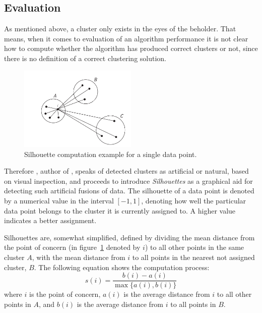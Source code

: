 \subsection{Evaluation}
As mentioned above, a cluster only exists in the eyes of the 
beholder. That means, when it comes to evaluation of an algorithm 
performance it is not clear how to compute whether the algorithm has produced
correct clusters or not, since there is no definition of a correct clustering solution. 
\begin{figure}[h!]
    \centering
    \includegraphics[width=0.5\textwidth]{images/silhouette_computation_clusters.pdf}
    \caption{Silhouette computation example for a single data point.
    \label{fig:silhouette-computation-clusters} }
\end{figure}

Therefore \citeauthor{silhouettes}, author of , speaks of detected clusters
as artificial or natural, based on visual inspection, and proceeds 
to introduce \emph{Silhouettes} as a graphical aid for detecting 
such artificial fusions of data. The silhouette of a data point is 
denoted by a numerical value in the interval $[-1, 1]$, denoting how well
the particular data point belongs to the cluster it is currently
assigned to. A higher value indicates a better assignment.

Silhouettes are, somewhat simplified, defined by dividing the mean
distance from the point of concern (in 
figure~\ref{fig:silhouette-computation-clusters} denoted by $i$) to
all other points in the same cluster $A$, with the mean distance from
$i$ to all points in the nearest not assigned cluster, $B$. The following
equation shows the computation process:
\begin{equation}
    \label{eq:silhouette-computation}
    s(i) = \frac{b(i) - a(i)}{\max\{a(i), b(i)\}}
\end{equation}
where $i$ is the point of concern, $a(i)$ is the average distance
from $i$ to all other points in $A$, and $b(i)$ is the average
distance from $i$ to all points in $B$.


